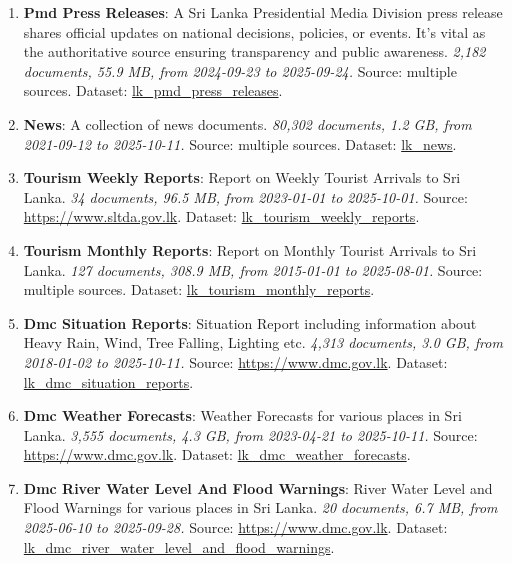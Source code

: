 \documentclass[10pt,a4paper]{article}%
\begin{document}
\begin{enumerate}
\item%
\textbf{Pmd Press Releases}: A Sri Lanka Presidential Media Division press release shares official updates on national decisions, policies, or events. It’s vital as the authoritative source ensuring transparency and public awareness.\textit{ 2,182 documents, 55.9 MB, from 2024{-}09{-}23 to 2025{-}09{-}24.} Source: multiple sources. Dataset: \href{https://github.com/nuuuwan/lk\_pmd/tree/data\_lk\_pmd\_press\_releases/data/lk\_pmd\_press\_releases}{lk\_pmd\_press\_releases}.%
\item%
\textbf{News}: A collection of news documents.\textit{ 80,302 documents, 1.2 GB, from 2021{-}09{-}12 to 2025{-}10{-}11.} Source: multiple sources. Dataset: \href{https://github.com/nuuuwan/lk\_news/tree/data/data/lk\_news}{lk\_news}.%
\item%
\textbf{Tourism Weekly Reports}: Report on Weekly Tourist Arrivals to Sri Lanka.\textit{ 34 documents, 96.5 MB, from 2023{-}01{-}01 to 2025{-}10{-}01.} Source: \href{https://www.sltda.gov.lk}{https://www.sltda.gov.lk}. Dataset: \href{https://github.com/nuuuwan/lk\_tourism/tree/data\_lk\_tourism\_weekly\_reports/data/lk\_tourism\_weekly\_reports}{lk\_tourism\_weekly\_reports}.%
\item%
\textbf{Tourism Monthly Reports}: Report on Monthly Tourist Arrivals to Sri Lanka.\textit{ 127 documents, 308.9 MB, from 2015{-}01{-}01 to 2025{-}08{-}01.} Source: multiple sources. Dataset: \href{https://github.com/nuuuwan/lk\_tourism/tree/data\_lk\_tourism\_monthly\_reports/data/lk\_tourism\_monthly\_reports}{lk\_tourism\_monthly\_reports}.%
\item%
\textbf{Dmc Situation Reports}: Situation Report including information about Heavy Rain, Wind, Tree Falling, Lighting etc.\textit{ 4,313 documents, 3.0 GB, from 2018{-}01{-}02 to 2025{-}10{-}11.} Source: \href{https://www.dmc.gov.lk}{https://www.dmc.gov.lk}. Dataset: \href{https://github.com/nuuuwan/lk\_dmc/tree/data\_lk\_dmc\_situation\_reports/data/lk\_dmc\_situation\_reports}{lk\_dmc\_situation\_reports}.%
\item%
\textbf{Dmc Weather Forecasts}: Weather Forecasts for various places in Sri Lanka.\textit{ 3,555 documents, 4.3 GB, from 2023{-}04{-}21 to 2025{-}10{-}11.} Source: \href{https://www.dmc.gov.lk}{https://www.dmc.gov.lk}. Dataset: \href{https://github.com/nuuuwan/lk\_dmc/tree/data\_lk\_dmc\_weather\_forecasts/data/lk\_dmc\_weather\_forecasts}{lk\_dmc\_weather\_forecasts}.%
\item%
\textbf{Dmc River Water Level And Flood Warnings}: River Water Level and Flood Warnings for various places in Sri Lanka.\textit{ 20 documents, 6.7 MB, from 2025{-}06{-}10 to 2025{-}09{-}28.} Source: \href{https://www.dmc.gov.lk}{https://www.dmc.gov.lk}. Dataset: \href{https://github.com/nuuuwan/lk\_dmc/tree/data\_lk\_dmc\_river\_water\_level\_and\_flood\_warnings/data/lk\_dmc\_river\_water\_level\_and\_flood\_warnings}{lk\_dmc\_river\_water\_level\_and\_flood\_warnings}.%

\end{enumerate}
\end{document}
